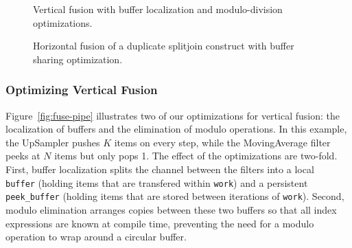\begin{figure}
\centering
{}
\subfigure{\label{fig:fuse-pipe-a}}
\subfigure{\label{fig:fuse-pipe-b}}
\vspace{-6pt}
\caption{\protect\small Vertical fusion with buffer localization and
modulo-division optimizations. \label{fig:fuse-pipe}}
\vspace{12pt}
\subfigure{\label{fig:fuse-splitjoin-a}}
\subfigure{\label{fig:fuse-splitjoin-b}}
\caption{\protect\small Horizontal fusion of a duplicate splitjoin
construct with buffer sharing optimization. \protect\label{fig:fuse-splitjoin}}
\end{figure}

\subsubsection{Optimizing Vertical Fusion}

Figure~\ref{fig:fuse-pipe} illustrates two of our optimizations for
vertical fusion: the localization of buffers and the elimination of
modulo operations.  In this example, the UpSampler pushes $K$ items on
every step, while the MovingAverage filter peeks at $N$ items but only
pops 1.  The effect of the optimizations are two-fold.  First, buffer
localization splits the channel between the filters into a local {\tt
buffer} (holding items that are transfered within {\tt work}) and a
persistent {\tt peek\_buffer} (holding items that are stored between
iterations of {\tt work}).  Second, modulo elimination arranges copies
between these two buffers so that all index expressions are known at
compile time, preventing the need for a modulo operation to wrap
around a circular buffer.

